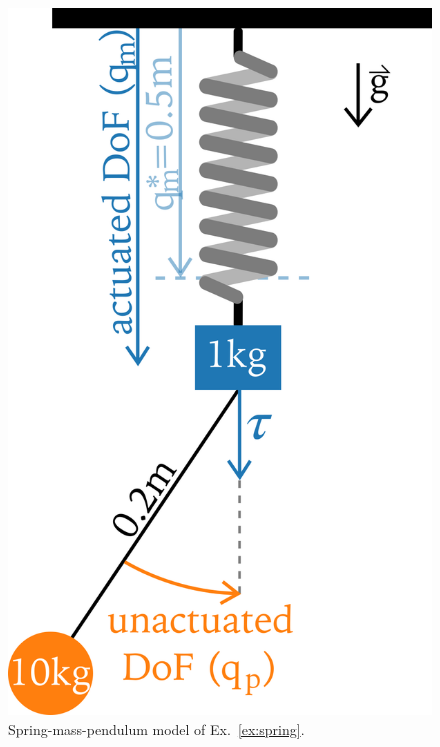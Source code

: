 \begin{figure}[t!]
\centering
\includegraphics[width=0.35\columnwidth]{figures/Mass_Pendulum_Model_2.png}
\caption{Spring-mass-pendulum model of Ex.~\ref{ex:spring}.}
\label{fig:Mass_Pendulum_Model}
\end{figure}

